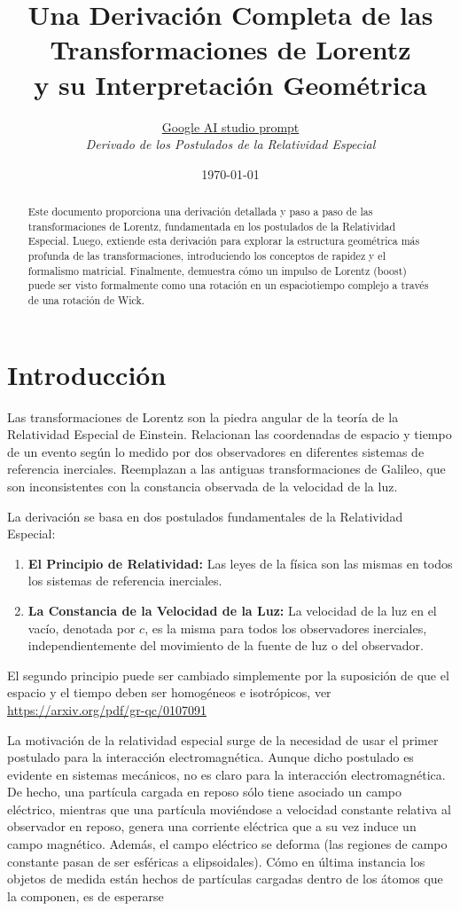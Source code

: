 \documentclass[11pt,a4paper]{article}
\title{Una Derivación Completa de las Transformaciones de Lorentz \\ y su Interpretación Geométrica}
\author{\href{https://bit.ly/lorentztransformation}{Google AI studio prompt}\\ \small \emph{Derivado de los Postulados de la Relatividad Especial}}
\date{\today}
\begin{document}
\maketitle
\tableofcontents


\begin{abstract}
Este documento proporciona una derivación detallada y paso a paso de las transformaciones de Lorentz, fundamentada en los postulados de la Relatividad Especial. Luego, extiende esta derivación para explorar la estructura geométrica más profunda de las transformaciones, introduciendo los conceptos de rapidez y el formalismo matricial. Finalmente, demuestra cómo un impulso de Lorentz (boost) puede ser visto formalmente como una rotación en un espaciotiempo complejo a través de una rotación de Wick.
\end{abstract}

\section{Introducción}

Las transformaciones de Lorentz son la piedra angular de la teoría de la Relatividad Especial de Einstein. Relacionan las coordenadas de espacio y tiempo de un evento según lo medido por dos observadores en diferentes sistemas de referencia inerciales. Reemplazan a las antiguas transformaciones de Galileo, que son inconsistentes con la constancia observada de la velocidad de la luz.

La derivación se basa en dos postulados fundamentales de la Relatividad Especial:
\begin{enumerate}
    \item \textbf{El Principio de Relatividad:} Las leyes de la física son las mismas en todos los sistemas de referencia inerciales.
    \item \textbf{La Constancia de la Velocidad de la Luz:} La velocidad de la luz en el vacío, denotada por $c$, es la misma para todos los observadores inerciales, independientemente del movimiento de la fuente de luz o del observador.
\end{enumerate}

El segundo principio puede ser cambiado simplemente por la suposición de que el espacio y el tiempo deben ser homogéneos e isotrópicos, ver \url{https://arxiv.org/pdf/gr-qc/0107091}

La motivación de la relatividad especial surge de la necesidad de usar el primer postulado para la interacción electromagnética. Aunque dicho postulado es evidente en sistemas mecánicos, no es claro para la interacción electromagnética. De hecho, una partícula cargada en reposo sólo tiene asociado un campo eléctrico, mientras que una partícula moviéndose a velocidad constante relativa al observador en reposo, genera una corriente eléctrica que a su vez induce un campo magnético. Además, el campo eléctrico se deforma (las regiones de campo constante pasan de ser esféricas a elipsoidales). Cómo en última instancia los objetos de medida están hechos de partículas cargadas dentro de los átomos que la componen, es de esperarse
\end{document}
